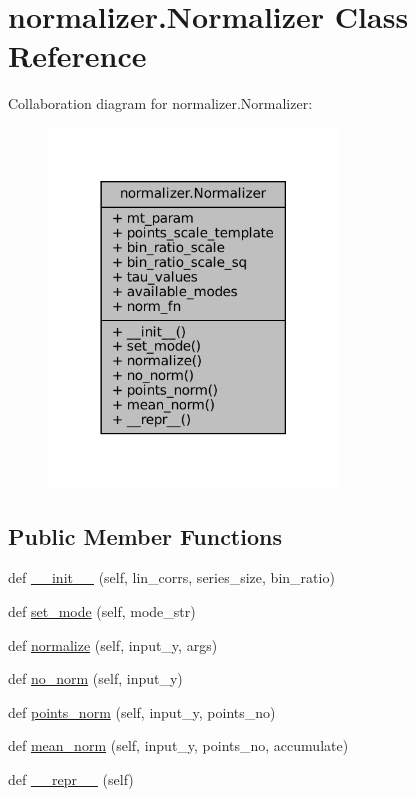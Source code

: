 \hypertarget{classnormalizer_1_1Normalizer}{}\section{normalizer.\+Normalizer Class Reference}
\label{classnormalizer_1_1Normalizer}


Collaboration diagram for normalizer.\+Normalizer\+:
\nopagebreak
\begin{figure}[H]
\begin{center}
\leavevmode
\includegraphics[width=218pt]{dc/d77/classnormalizer_1_1Normalizer__coll__graph}
\end{center}
\end{figure}
\subsection*{Public Member Functions}
\begin{DoxyCompactItemize}
\item 
def \hyperlink{classnormalizer_1_1Normalizer_afccec17549a3a8de54c39b7b5de3d4b7}{\+\_\+\+\_\+init\+\_\+\+\_\+} (self, lin\+\_\+corrs, series\+\_\+size, bin\+\_\+ratio)
\item 
def \hyperlink{classnormalizer_1_1Normalizer_ab4e48dd4987836c7254f148672dc32f0}{set\+\_\+mode} (self, mode\+\_\+str)
\item 
def \hyperlink{classnormalizer_1_1Normalizer_acae7ff724a12ef29c97f6eb2d30f5d62}{normalize} (self, input\+\_\+y, args)
\item 
def \hyperlink{classnormalizer_1_1Normalizer_a7965c29d7d3a867dbb82cc7f3e7e69b3}{no\+\_\+norm} (self, input\+\_\+y)
\item 
def \hyperlink{classnormalizer_1_1Normalizer_a44aea90aa5ab90fbc6cc617acdc589c5}{points\+\_\+norm} (self, input\+\_\+y, points\+\_\+no)
\item 
def \hyperlink{classnormalizer_1_1Normalizer_ac9530ba0efaa543756ecfef0e871b63e}{mean\+\_\+norm} (self, input\+\_\+y, points\+\_\+no, accumulate)
\item 
def \hyperlink{classnormalizer_1_1Normalizer_a09b6d62bec3fca383a1a9c82cc74836a}{\+\_\+\+\_\+repr\+\_\+\+\_\+} (self)
\end{DoxyCompactItemize}
